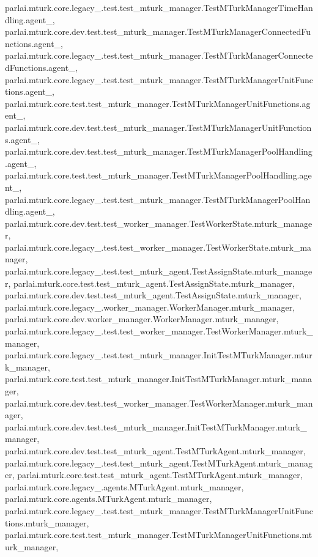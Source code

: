 parlai.\+mturk.\+core.\+legacy\+\_.\+test.\+test\+\_\+mturk\+\_\+manager.\+Test\+M\+Turk\+Manager\+Time\+Handling.\+agent\+\_, parlai.\+mturk.\+core.\+dev.\+test.\+test\+\_\+mturk\+\_\+manager.\+Test\+M\+Turk\+Manager\+Connected\+Functions.\+agent\+\_, parlai.\+mturk.\+core.\+legacy\+\_.\+test.\+test\+\_\+mturk\+\_\+manager.\+Test\+M\+Turk\+Manager\+Connected\+Functions.\+agent\+\_, parlai.\+mturk.\+core.\+legacy\+\_.\+test.\+test\+\_\+mturk\+\_\+manager.\+Test\+M\+Turk\+Manager\+Unit\+Functions.\+agent\+\_, parlai.\+mturk.\+core.\+test.\+test\+\_\+mturk\+\_\+manager.\+Test\+M\+Turk\+Manager\+Unit\+Functions.\+agent\+\_, parlai.\+mturk.\+core.\+dev.\+test.\+test\+\_\+mturk\+\_\+manager.\+Test\+M\+Turk\+Manager\+Unit\+Functions.\+agent\+\_, parlai.\+mturk.\+core.\+dev.\+test.\+test\+\_\+mturk\+\_\+manager.\+Test\+M\+Turk\+Manager\+Pool\+Handling.\+agent\+\_, parlai.\+mturk.\+core.\+test.\+test\+\_\+mturk\+\_\+manager.\+Test\+M\+Turk\+Manager\+Pool\+Handling.\+agent\+\_, parlai.\+mturk.\+core.\+legacy\+\_.\+test.\+test\+\_\+mturk\+\_\+manager.\+Test\+M\+Turk\+Manager\+Pool\+Handling.\+agent\+\_, parlai.\+mturk.\+core.\+dev.\+test.\+test\+\_\+worker\+\_\+manager.\+Test\+Worker\+State.\+mturk\+\_\+manager, parlai.\+mturk.\+core.\+legacy\+\_.\+test.\+test\+\_\+worker\+\_\+manager.\+Test\+Worker\+State.\+mturk\+\_\+manager, parlai.\+mturk.\+core.\+legacy\+\_.\+test.\+test\+\_\+mturk\+\_\+agent.\+Test\+Assign\+State.\+mturk\+\_\+manager, parlai.\+mturk.\+core.\+test.\+test\+\_\+mturk\+\_\+agent.\+Test\+Assign\+State.\+mturk\+\_\+manager, parlai.\+mturk.\+core.\+dev.\+test.\+test\+\_\+mturk\+\_\+agent.\+Test\+Assign\+State.\+mturk\+\_\+manager, parlai.\+mturk.\+core.\+legacy\+\_.\+worker\+\_\+manager.\+Worker\+Manager.\+mturk\+\_\+manager, parlai.\+mturk.\+core.\+dev.\+worker\+\_\+manager.\+Worker\+Manager.\+mturk\+\_\+manager, parlai.\+mturk.\+core.\+legacy\+\_.\+test.\+test\+\_\+worker\+\_\+manager.\+Test\+Worker\+Manager.\+mturk\+\_\+manager, parlai.\+mturk.\+core.\+legacy\+\_.\+test.\+test\+\_\+mturk\+\_\+manager.\+Init\+Test\+M\+Turk\+Manager.\+mturk\+\_\+manager, parlai.\+mturk.\+core.\+test.\+test\+\_\+mturk\+\_\+manager.\+Init\+Test\+M\+Turk\+Manager.\+mturk\+\_\+manager, parlai.\+mturk.\+core.\+dev.\+test.\+test\+\_\+worker\+\_\+manager.\+Test\+Worker\+Manager.\+mturk\+\_\+manager, parlai.\+mturk.\+core.\+dev.\+test.\+test\+\_\+mturk\+\_\+manager.\+Init\+Test\+M\+Turk\+Manager.\+mturk\+\_\+manager, parlai.\+mturk.\+core.\+dev.\+test.\+test\+\_\+mturk\+\_\+agent.\+Test\+M\+Turk\+Agent.\+mturk\+\_\+manager, parlai.\+mturk.\+core.\+legacy\+\_.\+test.\+test\+\_\+mturk\+\_\+agent.\+Test\+M\+Turk\+Agent.\+mturk\+\_\+manager, parlai.\+mturk.\+core.\+test.\+test\+\_\+mturk\+\_\+agent.\+Test\+M\+Turk\+Agent.\+mturk\+\_\+manager, parlai.\+mturk.\+core.\+legacy\+\_.\+agents.\+M\+Turk\+Agent.\+mturk\+\_\+manager, parlai.\+mturk.\+core.\+agents.\+M\+Turk\+Agent.\+mturk\+\_\+manager, parlai.\+mturk.\+core.\+legacy\+\_.\+test.\+test\+\_\+mturk\+\_\+manager.\+Test\+M\+Turk\+Manager\+Unit\+Functions.\+mturk\+\_\+manager, parlai.\+mturk.\+core.\+test.\+test\+\_\+mturk\+\_\+manager.\+Test\+M\+Turk\+Manager\+Unit\+Functions.\+mturk\+\_\+manager, 